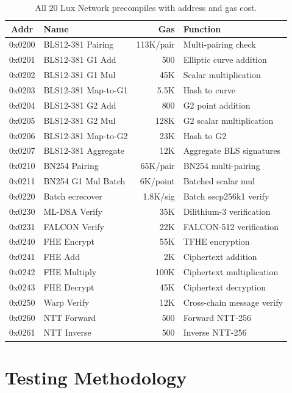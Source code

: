 \documentclass[11pt,a4paper]{article}
\begin{document}
\begin{table}[H]
\centering
\small
\begin{tabular}{@{}clrl@{}}
\toprule
\textbf{Addr} & \textbf{Name} & \textbf{Gas} & \textbf{Function} \\
\midrule
0x0200 & BLS12-381 Pairing & 113K/pair & Multi-pairing check \\
0x0201 & BLS12-381 G1 Add & 500 & Elliptic curve addition \\
0x0202 & BLS12-381 G1 Mul & 45K & Scalar multiplication \\
0x0203 & BLS12-381 Map-to-G1 & 5.5K & Hash to curve \\
0x0204 & BLS12-381 G2 Add & 800 & G2 point addition \\
0x0205 & BLS12-381 G2 Mul & 128K & G2 scalar multiplication \\
0x0206 & BLS12-381 Map-to-G2 & 23K & Hash to G2 \\
0x0207 & BLS12-381 Aggregate & 12K & Aggregate BLS signatures \\
0x0210 & BN254 Pairing & 65K/pair & BN254 multi-pairing \\
0x0211 & BN254 G1 Mul Batch & 6K/point & Batched scalar mul \\
0x0220 & Batch ecrecover & 1.8K/sig & Batch secp256k1 verify \\
0x0230 & ML-DSA Verify & 35K & Dilithium-3 verification \\
0x0231 & FALCON Verify & 22K & FALCON-512 verification \\
0x0240 & FHE Encrypt & 55K & TFHE encryption \\
0x0241 & FHE Add & 2K & Ciphertext addition \\
0x0242 & FHE Multiply & 100K & Ciphertext multiplication \\
0x0243 & FHE Decrypt & 45K & Ciphertext decryption \\
0x0250 & Warp Verify & 12K & Cross-chain message verify \\
0x0260 & NTT Forward & 500 & Forward NTT-256 \\
0x0261 & NTT Inverse & 500 & Inverse NTT-256 \\
\bottomrule
\end{tabular}
\caption{All 20 Lux Network precompiles with address and gas cost.}
\end{table}

\section{Testing Methodology}
\end{document}
